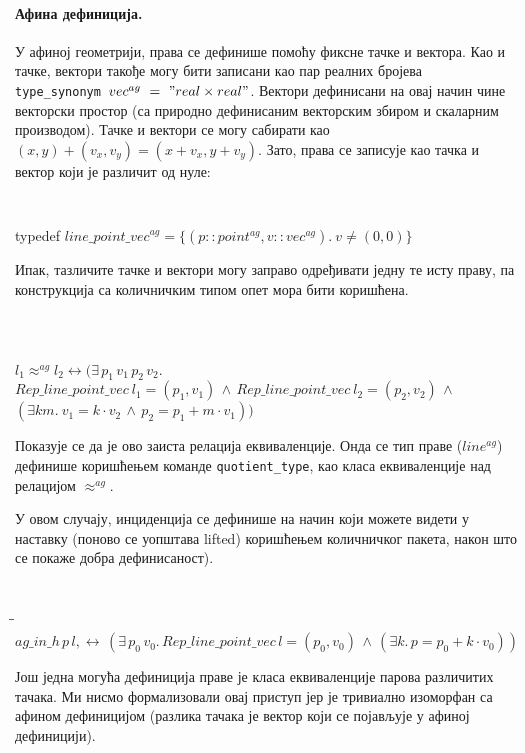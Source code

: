 \paragraph{Афина дефиниција.}
У афиној геометрији, права се дефинише помоћу фиксне тачке и
вектора. Као и тачке, вектори такође могу бити записани као пар
реалних бројева {\tt type\_synonym\ $vec^{ag}\ =\ "real \times
  real"$}. Вектори дефинисани на овај начин чине векторски простор (са
природно дефинисаним векторским збиром и скаларним производом). Тачке
и вектори се могу сабирати као $(x, y) + (v_x, v_y) = (x + v_x, y +
v_y)$. Зато, права се записује као тачка и вектор који је различит од
нуле: 
{\tt
\begin{tabbing}
typedef $\mathit{line\_point\_vec}^{ag} =\{(p::point^{ag}, v::vec^{ag}).\ v \neq (0, 0)\}$
\end{tabbing}
}

Ипак, тазличите тачке и вектори могу заправо одређивати једну те исту
праву, па конструкција са количничким типом опет мора бити коришћена.

{\tt
\begin{tabbing}
\hspace{5mm}\=\\
$l_1 \approx^{ag} l_2 \longleftrightarrow (\exists\,p_1\,v_1\,p_2\,v_2.$\\
\>$\mathit{Rep\_line\_point\_vec}\ l_1 = (p_1, v_1) \,\wedge\,  \mathit{Rep\_line\_point\_vec}\ l_2 = (p_2, v_2) \,\wedge$\\
\>$(\exists k m.\ v_1 = k\cdot v_2 \,\wedge\, p_2 = p_1 + m\cdot v_1))$
\end{tabbing}
}
\noindent Показује се да је ово заиста релација еквиваленције. Онда се
тип праве ($\mathit{line^{ag}}$) дефинише коришћењем команде
\verb|quotient_type|, као класа еквиваленције над релацијом
$\approx^{ag}$.

У овом случају, инциденција се дефинише на начин који можете видети у
наставку (поново се уопштава lifted) коришћењем количничког пакета,
након што се покаже добра дефинисаност).

{\tt
\begin{tabbing}
\hspace{5mm}\=\hspace{5mm}\=\kill
$ag\_in\_h\,p\,l,\longleftrightarrow\,(\exists\,p_0\,v_0.\,\mathit{Rep\_line\_point\_vec}\,l = (p_0, v_0) \,\wedge\,  (\exists k.\,p = p_0 + k \cdot v_0))$
\end{tabbing}
}

Још једна могућа дефиниција праве је класа еквиваленције парова
различитих тачака. Ми нисмо формализовали овај приступ јер је
тривиално изоморфан са афином дефиницијом (разлика тачака је вектор
који се појављује у афиној дефиницији).

